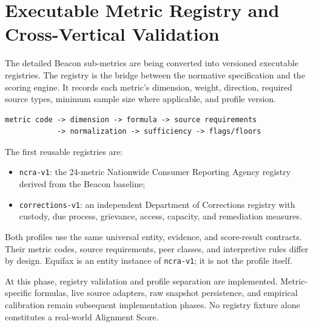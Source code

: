 \section{Executable Metric Registry and Cross-Vertical Validation}

The detailed Beacon sub-metrics are being converted into versioned executable
registries. The registry is the bridge between the normative specification and
the scoring engine. It records each metric's dimension, weight, direction,
required source types, minimum sample size where applicable, and profile
version.

\begin{lstlisting}
metric code -> dimension -> formula -> source requirements
            -> normalization -> sufficiency -> flags/floors
\end{lstlisting}

The first reusable registries are:

\begin{itemize}
  \item \texttt{ncra-v1}: the 24-metric Nationwide Consumer Reporting Agency
        registry derived from the Beacon baseline;
  \item \texttt{corrections-v1}: an independent Department of Corrections
        registry with custody, due process, grievance, access, capacity, and
        remediation measures.
\end{itemize}

Both profiles use the same universal entity, evidence, and score-result
contracts. Their metric codes, source requirements, peer classes, and
interpretive rules differ by design. Equifax is an entity instance of
\texttt{ncra-v1}; it is not the profile itself.

At this phase, registry validation and profile separation are implemented.
Metric-specific formulas, live source adapters, raw snapshot persistence, and
empirical calibration remain subsequent implementation phases. No registry
fixture alone constitutes a real-world Alignment Score.
